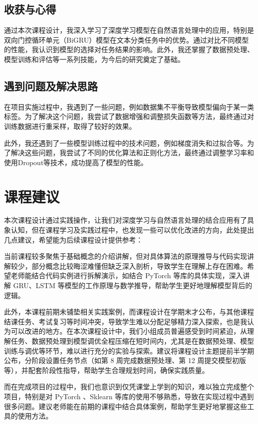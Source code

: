 \section{收获与心得}

通过本次课程设计，我深入学习了深度学习模型在自然语言处理中的应用，特别是双向门控循环单元（BiGRU）模型在文本分类任务中的优势。通过对比不同模型的性能，我认识到模型的选择对任务结果的影响。此外，我还掌握了数据预处理、模型训练和评估等一系列技能，为今后的研究奠定了基础。

\section{遇到问题及解决思路}

在项目实施过程中，我遇到了一些问题，例如数据集不平衡导致模型偏向于某一类标签。为了解决这个问题，我尝试了数据增强和调整损失函数等方法，最终通过对训练数据进行重采样，取得了较好的效果。

此外，我还遇到了一些模型训练过程中的技术问题，例如梯度消失和过拟合等。为了解决这些问题，我尝试了不同的优化算法和正则化方法，最终通过调整学习率和使用Dropout等技术，成功提高了模型的性能。

\chapter{课程建议}

本次课程设计通过实践操作，让我们对深度学习与自然语言处理的结合应用有了具象认知，但在课程学习及实践过程中，也发现一些可以优化改进的方向，此处提出几点建议，希望能为后续课程设计提供参考：

当前课程较多聚焦于基础概念的介绍讲解，但对具体算法的原理推导与代码实现讲解较少，部分概念比较晦涩难懂但缺乏深入剖析，导致学生在理解上存在困难。希望老师能结合代码实例进行拆解演示，如结合 PyTorch 等库的具体实现，深入讲解 GRU、LSTM 等模型的工作原理与数学推导，帮助学生更好地理解模型背后的逻辑。

此外，本课程前期未铺垫相关实践案例，而课程设计在学期末才公布，与其他课程结课任务、考试复习等时间冲突，导致学生难以分配足够精力深入探索，也是我认为可以改进的地方。在本次课程设计中，我们小组成员普遍感受到时间紧迫，从理解任务、数据预处理到模型调优全程压缩在短时间内，尤其是在数据预处理、模型训练与调优等环节，难以进行充分的实验与探索。建议将课程设计主题提前半学期公布，分阶段设置任务节点（如第 8 周完成数据预处理、第 12 周提交模型初版等），并配套阶段性指导，帮助学生合理规划时间，确保实践质量。

而在完成项目的过程中，我们也意识到仅凭课堂上学到的知识，难以独立完成整个项目，特别是对 PyTorch 、Sklearn 等库的使用不够熟悉，导致在实现过程中遇到很多问题。建议老师能在前期的课程中结合具体案例，帮助学生更好地掌握这些工具的使用方法。